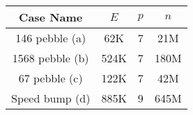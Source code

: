 \begin{subtable}{\textwidth}\centering
\begin{tabular}{||c| c c c ||}
  \hline
  Case Name & $E$ & $p$ & $n$\\
  \hline\hline
  146 pebble  (a) & 62K & 7 & 21M\\
  1568 pebble (b) & 524K & 7 & 180M\\
  67 pebble   (c) & 122K & 7 & 42M\\
  Speed bump  (d) & 885K & 9 & 645M\\
\hline
\end{tabular}
\end{subtable}